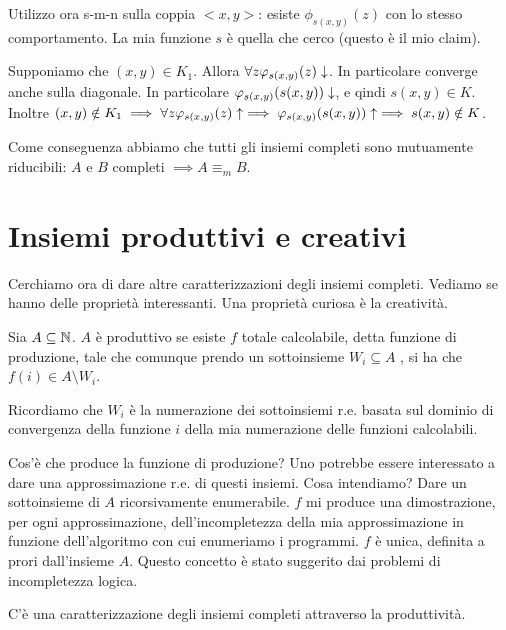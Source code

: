 Utilizzo ora s-m-n sulla coppia $<x,y>$: esiste $\phi_{s(x,y)}(z)$ con lo stesso comportamento. La mia
funzione $s$ è quella che cerco (questo è il mio claim).

Supponiamo che $(x,y) \in K_{1}$. Allora $\forall z \varphi_{s(x,y)}(z) \downarrow$. In particolare
converge anche sulla diagonale. In particolare $\varphi_{s(x,y)}(s(x,y)) \downarrow$, e qindi $s(x,y) \in
K$. Inoltre $(x,y) \notin K_{1} \implies \forall z \varphi_{s(x,y)}(z) \uparrow \implies
\varphi_{s(x,y)}(s(x,y)) \uparrow \implies s(x,y) \notin K$.

Come conseguenza abbiamo che tutti gli insiemi completi sono mutuamente riducibili: $A$ e $B$ completi
$\implies A \equiv_{m} B$.

\section{Insiemi produttivi e creativi}

Cerchiamo ora di dare altre caratterizzazioni degli insiemi completi. Vediamo se hanno delle
proprietà interessanti. Una proprietà curiosa è la creatività.

\begin{defn}
    Sia $A \subseteq \mathbb{N}$. $A$ è produttivo se esiste $f$ totale calcolabile, detta funzione di
    produzione, tale che comunque prendo un sottoinsieme $W_{i} \subseteq A$ , si ha che $f(i) \in A
    \setminus W_{i}$.
\end{defn}

Ricordiamo che $W_{i}$ è la numerazione dei sottoinsiemi r.e. basata sul dominio di convergenza
della funzione $i$ della mia numerazione delle funzioni calcolabili.

Cos'è che produce la funzione di produzione? Uno potrebbe essere interessato a dare una
approssimazione r.e. di questi insiemi. Cosa intendiamo? Dare un sottoinsieme di $A$ ricorsivamente
enumerabile. $f$ mi produce una dimostrazione, per ogni approssimazione, dell'incompletezza della
mia approssimazione in funzione dell'algoritmo con cui enumeriamo i programmi. $f$ è unica,
definita a prori dall'insieme $A$. Questo concetto è stato suggerito dai problemi di incompletezza
logica.

C'è una caratterizzazione degli insiemi completi attraverso la produttività.


